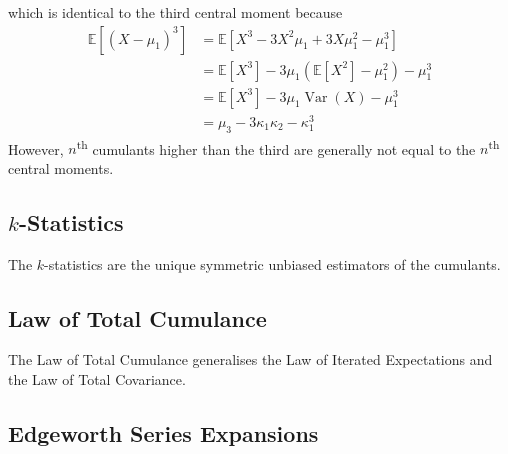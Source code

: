\documentclass[11pt]{report} %
\begin{document}
which is identical to the third central moment because
\begin{align}
\mathbb{E}\left[\left(X - \mu_{1}\right)^{3}\right] &= \mathbb{E}\left[X^{3} - 3X^{2}\mu_{1} + 3X\mu_{1}^{2} - \mu_{1}^{3}\right] \\
&= \mathbb{E}\left[X^{3}\right] - 3\mu_{1}\left(\mathbb{E}\left[X^{2}\right] - \mu_{1}^{2}\right) - \mu_{1}^{3} \\
&= \mathbb{E}\left[X^{3}\right] - 3\mu_{1}\operatorname{Var}\left(X\right) - \mu_{1}^{3} \\
&= \mu_{3} - 3\kappa_{1}\kappa_{2} - \kappa_{1}^{3}
\end{align}
However, $n$\textsuperscript{th} cumulants higher than the third are generally not equal to the $n$\textsuperscript{th} central moments.

\subsection{$k$-Statistics}

The $k$-statistics are the unique symmetric unbiased estimators of the cumulants.

\subsection{Law of Total Cumulance}

The Law of Total Cumulance generalises the Law of Iterated Expectations and the Law of Total Covariance.

\subsection{Edgeworth Series Expansions}
\end{document}
